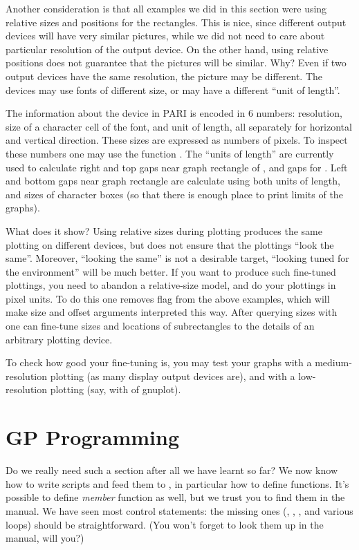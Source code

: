 Another consideration is that all examples we did in this section were
using relative sizes and positions for the rectangles.  This is nice, since
different output devices will have very similar pictures, while we
did not need to care about particular resolution of the output device.
On the other hand,
using relative positions does not guarantee that the pictures will be
similar.  Why?  Even if two output devices have the same resolution,
the picture may be different.  The devices may use fonts of different
size, or may have a different ``unit of length''.

The information about the device in PARI is encoded in 6 numbers: resolution,
size of a character cell of the font, and unit of length, all separately
for horizontal and vertical direction.  These sizes are expressed as
numbers of pixels.  To inspect these numbers one may use the function
.  The ``units of length'' are currently used to calculate
right and top gaps near graph rectangle of , and gaps for
.  Left and bottom gaps near graph rectangle are calculate
using both units of length, and sizes of character boxes (so that there
is enough place to print limits of the graphs).

What does it show?  Using relative sizes during plotting produces
 the same plotting on different devices, but does not
ensure that the plottings ``look the same''.  Moreover, ``looking the
same'' is not a desirable target, ``looking tuned for the environment''
will be much better.  If you want to produce such fine-tuned plottings,
you need to abandon a relative-size model, and do your plottings in
pixel units.  To do this one removes flag  from the above
examples, which will make size and offset arguments interpreted this way.
After querying sizes with  one can fine-tune sizes and
locations of subrectangles to the details of an arbitrary plotting
device.

To check how good your fine-tuning is, you may test your graphs with a
medium-resolution plotting (as many display output devices are), and
with a low-resolution plotting (say, with  of gnuplot).

\section{GP Programming}

Do we really need such a section after all we have learnt so far? We now
know how to write scripts and feed them to , in particular how to
define functions. It's possible to define \emph{member} function as well, but
we trust you to find them in the manual. We have seen most control
statements: the missing ones (, , ,
 and various  loops) should be straightforward. (You
won't forget to look them up in the manual, will you?)

